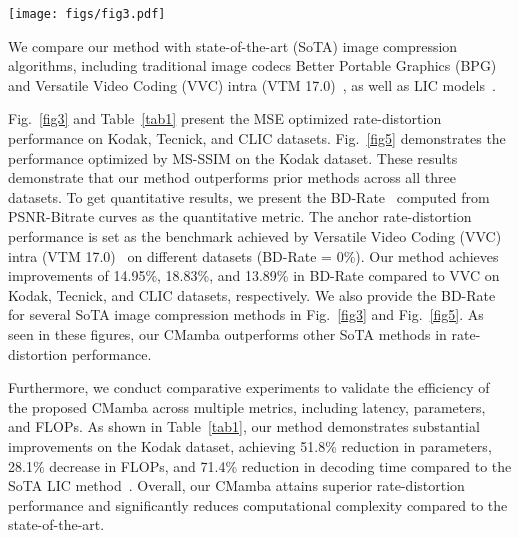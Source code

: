 \begin{figure*}[t]
  \centering
   \texttt{[image: figs/fig3.pdf]}
   \vspace{-1em}
   \caption{
   PSNR-Bitrate curves evaluated on Kodak, Tecnick, and CLIC datasets.
   The compared methods include state-of-the-art LIC models and handcrafted codecs.
   LIC models are optimized with MSE.
   }
   \vspace{-1em}
   \label{fig3}
\end{figure*}




We compare our method with state-of-the-art (SoTA) image compression algorithms, including traditional image codecs Better Portable Graphics (BPG)~\cite{bellard2018bpg} and Versatile Video Coding (VVC) intra (VTM 17.0)~\cite{bross2020versatile}, as well as LIC models~\cite{minnen2018joint, cheng2020learned, qian2021entroformer, he2022elic, zou2022devil, jiang2023mlic, liu2023learned, li2024frequency, jiang2023mlicpp}. 


Fig.~\ref{fig3} and Table~\ref{tab1} present the MSE optimized rate-distortion performance on Kodak, Tecnick, and CLIC datasets. Fig.~\ref{fig5} demonstrates the performance optimized by MS-SSIM on the Kodak dataset.
These results demonstrate that our method outperforms prior methods across all three datasets. 
To get quantitative results, we present the BD-Rate~\cite{tan2015video} computed from PSNR-Bitrate curves as the quantitative metric.
The anchor rate-distortion performance is set as the benchmark achieved by Versatile Video Coding (VVC) intra (VTM 17.0)~\cite{bross2020versatile} on different datasets (BD-Rate = 0\%). 
Our method achieves improvements of 14.95\%, 18.83\%, and 13.89\% in BD-Rate compared to VVC on Kodak, Tecnick, and CLIC datasets, respectively.
We also provide the BD-Rate for several SoTA image compression methods in Fig.~\ref{fig3} and Fig.~\ref{fig5}.
As seen in these figures, our CMamba outperforms other SoTA methods in rate-distortion performance.


Furthermore, we conduct comparative experiments to validate the efficiency of the proposed CMamba across multiple metrics, including latency, parameters, and FLOPs.
As shown in Table~\ref{tab1}, our method demonstrates substantial improvements on the Kodak dataset, achieving 51.8\% reduction in parameters, 28.1\% decrease in FLOPs, and 71.4\% reduction in decoding time compared to the SoTA LIC method~\cite{jiang2023mlicpp}.
Overall, our CMamba attains superior rate-distortion performance and significantly reduces computational complexity compared to the state-of-the-art.

